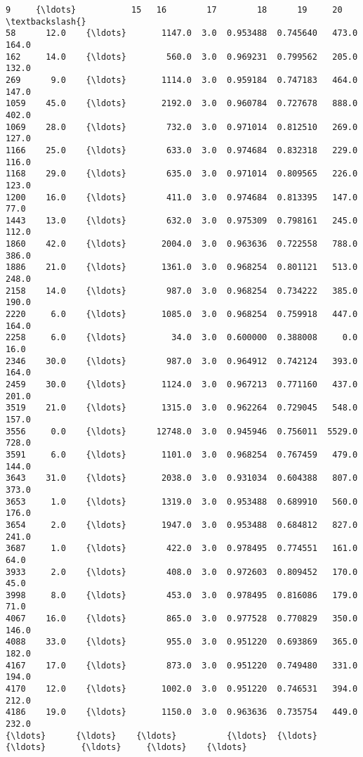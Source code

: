 \documentclass[11pt]{article}
\begin{document}
\begin{Verbatim}[commandchars=\\\{\}]
          9     {\ldots}           15   16        17        18      19     20  \textbackslash{}
58      12.0    {\ldots}       1147.0  3.0  0.953488  0.745640   473.0  164.0   
162     14.0    {\ldots}        560.0  3.0  0.969231  0.799562   205.0  132.0   
269      9.0    {\ldots}       1114.0  3.0  0.959184  0.747183   464.0  147.0   
1059    45.0    {\ldots}       2192.0  3.0  0.960784  0.727678   888.0  402.0   
1069    28.0    {\ldots}        732.0  3.0  0.971014  0.812510   269.0  127.0   
1166    25.0    {\ldots}        633.0  3.0  0.974684  0.832318   229.0  116.0   
1168    29.0    {\ldots}        635.0  3.0  0.971014  0.809565   226.0  123.0   
1200    16.0    {\ldots}        411.0  3.0  0.974684  0.813395   147.0   77.0   
1443    13.0    {\ldots}        632.0  3.0  0.975309  0.798161   245.0  112.0   
1860    42.0    {\ldots}       2004.0  3.0  0.963636  0.722558   788.0  386.0   
1886    21.0    {\ldots}       1361.0  3.0  0.968254  0.801121   513.0  248.0   
2158    14.0    {\ldots}        987.0  3.0  0.968254  0.734222   385.0  190.0   
2220     6.0    {\ldots}       1085.0  3.0  0.968254  0.759918   447.0  164.0   
2258     6.0    {\ldots}         34.0  3.0  0.600000  0.388008     0.0   16.0   
2346    30.0    {\ldots}        987.0  3.0  0.964912  0.742124   393.0  164.0   
2459    30.0    {\ldots}       1124.0  3.0  0.967213  0.771160   437.0  201.0   
3519    21.0    {\ldots}       1315.0  3.0  0.962264  0.729045   548.0  157.0   
3556     0.0    {\ldots}      12748.0  3.0  0.945946  0.756011  5529.0  728.0   
3591     6.0    {\ldots}       1101.0  3.0  0.968254  0.767459   479.0  144.0   
3643    31.0    {\ldots}       2038.0  3.0  0.931034  0.604388   807.0  373.0   
3653     1.0    {\ldots}       1319.0  3.0  0.953488  0.689910   560.0  176.0   
3654     2.0    {\ldots}       1947.0  3.0  0.953488  0.684812   827.0  241.0   
3687     1.0    {\ldots}        422.0  3.0  0.978495  0.774551   161.0   64.0   
3933     2.0    {\ldots}        408.0  3.0  0.972603  0.809452   170.0   45.0   
3998     8.0    {\ldots}        453.0  3.0  0.978495  0.816086   179.0   71.0   
4067    16.0    {\ldots}        865.0  3.0  0.977528  0.770829   350.0  146.0   
4088    33.0    {\ldots}        955.0  3.0  0.951220  0.693869   365.0  182.0   
4167    17.0    {\ldots}        873.0  3.0  0.951220  0.749480   331.0  194.0   
4170    12.0    {\ldots}       1002.0  3.0  0.951220  0.746531   394.0  212.0   
4186    19.0    {\ldots}       1150.0  3.0  0.963636  0.735754   449.0  232.0   
{\ldots}      {\ldots}    {\ldots}          {\ldots}  {\ldots}       {\ldots}       {\ldots}     {\ldots}    {\ldots}   

\end{Verbatim}
\end{document}
